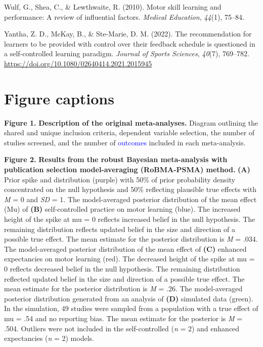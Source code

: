 \documentclass[
  man, donotrepeattitle,mask,floatsintext]{apa7}
\newlength{\cslhangindent}
\newlength{\cslentryspacingunit} %
\newenvironment{CSLReferences}[2] %
 {%
  \setlength{\parindent}{0pt}
  \ifodd #1
  \let\oldpar\par
  \def\par{\hangindent=\cslhangindent\oldpar}
  \fi
  \setlength{\parskip}{#2\cslentryspacingunit}
 }%
 {}
\begin{document}
\begin{CSLReferences}{1}{0}
\leavevmode{}%
Wulf, G., Shea, C., \& Lewthwaite, R. (2010). Motor skill learning and performance: A review of influential factors. \emph{Medical Education}, \emph{44}(1), 75--84.

\leavevmode{}%
Yantha, Z. D., McKay, B., \& Ste-Marie, D. M. (2022). The recommendation for learners to be provided with control over their feedback schedule is questioned in a self-controlled learning paradigm. \emph{Journal of Sports Sciences}, \emph{40}(7), 769--782. \url{https://doi.org/10.1080/02640414.2021.2015945}

\end{CSLReferences}

\newpage

\hypertarget{figure-captions}{%
\section{Figure captions}\label{figure-captions}}

\noindent
\textbf{Figure 1.} \textbf{Description of the original meta-analyses.} Diagram outlining the shared and unique inclusion criteria, dependent variable selection, the number of studies screened, and the number of \textcolor{blue}{outcomes} included in each meta-analysis.

\noindent
\textbf{Figure 2.} \textbf{Results from the robust Bayesian meta-analysis with publication selection model-averaging (RoBMA-PSMA) method.} \textbf{(A)} Prior spike and distribution (purple) with 50\% of prior probability density concentrated on the null hypothesis and 50\% reflecting plausible true effects with \emph{M} = 0 and \emph{SD} = 1. The model-averaged posterior distribution of the mean effect (Mu) of \textbf{(B)} self-controlled practice on motor learning (blue). The increased height of the spike at mu = 0 reflects increased belief in the null hypothesis. The remaining distribution reflects updated belief in the size and direction of a possible true effect. The mean estimate for the posterior distribution is \emph{M} = .034. The model-averaged posterior distribution of the mean effect of \textbf{(C)} enhanced expectancies on motor learning (red). The decreased height of the spike at mu = 0 reflects decreased belief in the null hypothesis. The remaining distribution reflected updated belief in the size and direction of a possible true effect. The mean estimate for the posterior distribution is \emph{M} = .26. The model-averaged posterior distribution generated from an analysis of \textbf{(D)} simulated data (green). In the simulation, 49 studies were sampled from a population with a true effect of mu = .54 and no reporting bias. The mean estimate for the posterior is \emph{M} = .504. Outliers were not included in the self-controlled (\emph{n} = 2) and enhanced expectancies (\emph{n} = 2) models.
\end{document}
